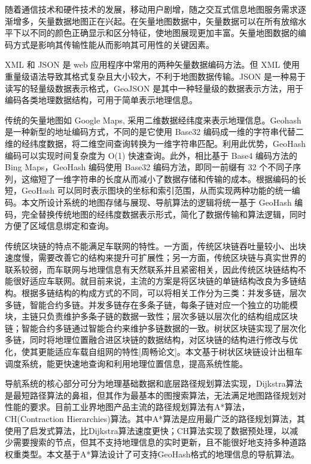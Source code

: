 随着通信技术和硬件技术的发展，移动用户剧增，随之交互式信息地图服务需求逐渐增多，矢量数据地图正在兴起。在矢量地图数据中，矢量数据可以在所有放缩水平下以不同的颜色正确显示和区分特征，使地图展现更加丰富。矢量地图数据的编码方式是影响其传输性能从而影响其可用性的关键因素。\par
XML 和 JSON 是 web 应用程序中常用的两种矢量数据编码方法。但 XML 使用重量级语法导致其格式复杂且大小较大，不利于地图数据传输。JSON 是一种易于读写的轻量级数据表示格式，GeoJSON 是其中一种轻量级的数据表示方法，用于编码各类地理数据结构，可用于简单表示地理信息。\par
传统的矢量地图如 Google Maps, 采用二维数据经纬度来表示地理信息。Geohash 是一种新型的地址编码方式，不同的是它使用 Base32 编码成一维的字符串代替二维的经纬度数据，将二维空间查询转换为一维字符串匹配。利用此优势，GeoHash 编码可以实现时间复杂度为 O(1) 快速查询。此外，相比基于 Base4 编码方法的 Bing Maps，GeoHash 编码使用 Base32 编码方法，即同一前缀有 32 个不同子序列，这缩短了一维字符串的长度从而减小了数据存储和传输的成本。根据编码的长短，GeoHash 可以同时表示图块的坐标和索引范围，从而实现两种功能的统一编码。本文所设计系统的地图存储与展现、导航算法的逻辑将统一基于 GeoHash 编码，完全替换传统地图的经纬度数据表示形式，简化了数据传输和算法逻辑，同时方便了区域信息绑定和查询。\par

传统区块链的特点不能满足车联网的特性。一方面，传统区块链吞吐量较小、出块速度慢，需要改善它的结构来提升可扩展性；另一方面，传统区块链与真实世界的联系较弱，而车联网与地理信息有天然联系并且紧密相关，因此传统区块链结构不能很好适应车联网。就目前来说，主流的方案是将区块链的单链结构改良为多链结构。根据多链结构的构成方式的不同，可以将相关工作分为三类：并发多链，层次多链，智能合约多链。并发多链存在多条子链，每条子链对应一个独立的功能模块，主链只负责维护多条子链的数据一致性；层次多链以层次化的结构组成区块链；智能合约多链通过智能合约来维护多链数据的一致。树状区块链实现了层次化多链，同时将地理位置融合进区块链的数据结构，对区块链的结构进行修改与优化，使其更能适应车载自组网的特性[周畅论文]。本文基于树状区块链设计出租车调度系统，能更快速地查询和利用地理位置信息，提高系统性能。\par

导航系统的核心部分可分为地理基础数据和底层路径规划算法实现，Dijkstra算法是最短路径算法的鼻祖，但其作为最基本的图搜索算法，无法满足地图路径规划对性能的要求。目前工业界地图产品主流的路径规划算法有A*算法，CH(Contraction Hierarchies)算法。其中A*算法是应用最广泛的路径规划算法，其使用了启发式算法，比Dijkstra算法速度更快；CH算法实现了数据预处理，以减少需要搜索的节点，但其不支持地理信息的实时更新，且不能很好地支持多种道路权重类型。本文基于A*算法设计了可支持GeoHash格式的地理信息的导航算法。

